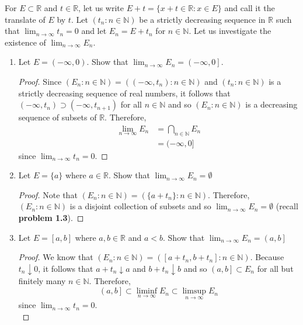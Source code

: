 \documentclass[12pt]{article}
\newcommand{\N}{\mathbb{N}}
\newcommand{\R}{\mathbb{R}}
\newenvironment{problem}[2][Problem]{\begin{trivlist}
		\item[\hskip \labelsep {\bfseries #1}\hskip \labelsep {\bfseries #2.}]}{\end{trivlist}}
\begin{document}
\begin{problem}{1.5}
	For $E\subset \R$ and $t\in \R$, let us write $E+t = \{x+t\in \R: x\in E\}$ and call it the translate of $E$ by $t$. Let $\left(t_{n}:n\in \N\right)$ be a strictly decreasing sequence in $\R$ such that $\lim_{n\to \infty} t_{n} = 0$ and let $E_{n} = E + t_{n}$ for $n\in \N$. Let us investigate the existence of $\lim_{n \to \infty} E_{n}$.
	\begin{enumerate}[label=\textbf{(\alph*)}]
		\item Let $E=\left(-\infty, 0\right)$. Show that $\lim_{n \to \infty} E_{n} = \left( -\infty, 0\right]$.
		\begin{proof}
			Since $\left(E_{n}: n\in \N\right) = \left((-\infty, t_{n}):n\in \N\right)$ and $(t_{n}:n\in \N)$ is a strictly decreasing sequence of real numbers, it follows that $(-\infty, t_{n}) \supset (-\infty, t_{n+1})$ for all $n\in \N$ and so $\left(E_{n}:n\in \N\right)$ is a decreasing sequence of subsets of $\R$. Therefore,
			\begin{align*}
				\lim_{n\to \infty} E_{n} &= \bigcap_{n\in \N} E_{n} \\
				&= (-\infty, 0]
			\end{align*}
		since $\lim_{n \to \infty} t_{n} = 0$.
		\end{proof}
	
	\item  Let $E=\{a\}$ where $a\in \R$. Show that $\lim_{n \to \infty} E_{n} = \emptyset$
	\begin{proof}
		Note that $\left(E_{n} : n\in \N\right) = \left(\{a+t_{n}\}: n\in \N\right)$. Therefore, $\left(E_{n}: n\in \N\right)$ is a disjoint collection of subsets and so $\lim_{n\to \infty} E_{n} = \emptyset$ (recall \textbf{problem 1.3}).
	\end{proof}

	\item  Let $E=[a,b]$ where $a,b \in \R$ and $a<b$. Show that $\lim_{n \to \infty} E_{n} = \left(a,b\right]$
	\begin{proof}
		We know that $\left( E_{n} : n\in \N\right) = \left([a+t_{n}, b+t_{n}]: n\in \N\right)$. Because $t_{n} \downarrow 0$, it follows that $a + t_{n} \downarrow a$ and $b+t_{n}\downarrow b$ and so $\left(a,b\right] \subset E_{n}$ for all but finitely many $n\in \N$. Therefore, 
		\begin{equation*} 
			\left(a,b\right] \subset \liminf_{n \to \infty} E_{n} \subset \limsup_{n\to \infty} E_{n}
		\end{equation*}
		since $\lim_{n \to \infty} t_{n} = 0$.\\
		

\end{proof}
\end{enumerate}
\end{problem}
\end{document}
